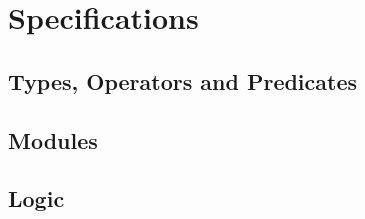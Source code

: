 \chapter{Specifications}

\section{Types, Operators and Predicates}

\section{Modules}

\section{Logic}
